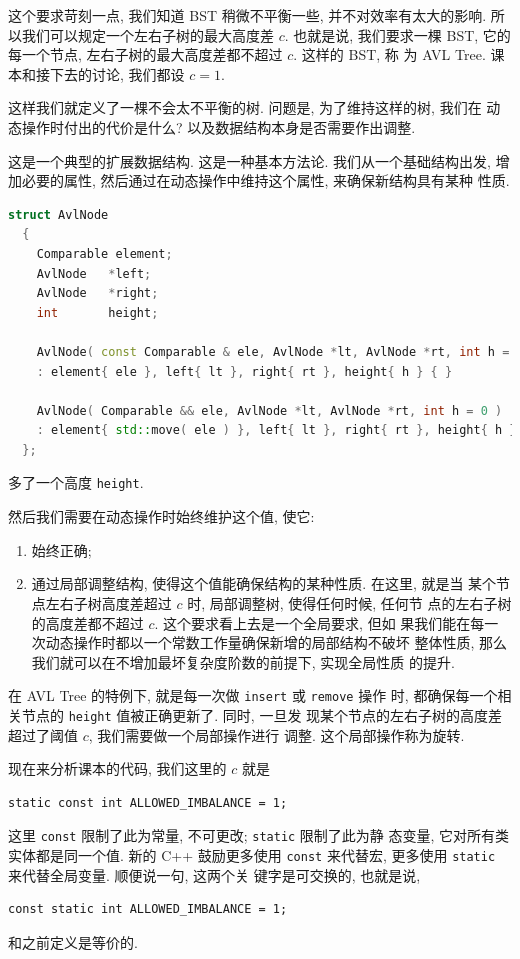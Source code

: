 \documentclass[a4paper]{ctexart}
\theoremstyle{definition}
\theoremstyle{definition}
\begin{document}
这个要求苛刻一点, 我们知道 BST 稍微不平衡一些, 并不对效率有太大的影响.
所以我们可以规定一个左右子树的最大高度差 $c$. 也就是说, 我们要求一棵
BST, 它的每一个节点, 左右子树的最大高度差都不超过 $c$. 这样的 BST, 称
为 AVL Tree. 课本和接下去的讨论, 我们都设 $c = 1$.

这样我们就定义了一棵不会太不平衡的树. 问题是, 为了维持这样的树, 我们在
动态操作时付出的代价是什么? 以及数据结构本身是否需要作出调整.

这是一个典型的扩展数据结构. 这是一种基本方法论. 我们从一个基础结构出发,
增加必要的属性, 然后通过在动态操作中维持这个属性, 来确保新结构具有某种
性质.

\begin{lstlisting}[language=C++]
  struct AvlNode
  {
    Comparable element;
    AvlNode   *left;
    AvlNode   *right;
    int       height;

    AvlNode( const Comparable & ele, AvlNode *lt, AvlNode *rt, int h = 0 )
    : element{ ele }, left{ lt }, right{ rt }, height{ h } { }
    
    AvlNode( Comparable && ele, AvlNode *lt, AvlNode *rt, int h = 0 )
    : element{ std::move( ele ) }, left{ lt }, right{ rt }, height{ h } { }
  };
\end{lstlisting}

多了一个高度 \verb|height|. 

然后我们需要在动态操作时始终维护这个值, 使它:
\begin{enumerate}
\item 始终正确;
\item 通过局部调整结构, 使得这个值能确保结构的某种性质. 在这里, 就是当
  某个节点左右子树高度差超过 $c$ 时, 局部调整树, 使得任何时候, 任何节
  点的左右子树的高度差都不超过 $c$. 这个要求看上去是一个全局要求, 但如
  果我们能在每一次动态操作时都以一个常数工作量确保新增的局部结构不破坏
  整体性质, 那么我们就可以在不增加最坏复杂度阶数的前提下, 实现全局性质
  的提升. 
\end{enumerate}

在 AVL Tree 的特例下, 就是每一次做 \verb|insert| 或 \verb|remove| 操作
时, 都确保每一个相关节点的 \verb|height| 值被正确更新了. 同时, 一旦发
现某个节点的左右子树的高度差超过了阈值 $c$, 我们需要做一个局部操作进行
调整. 这个局部操作称为旋转.

现在来分析课本的代码, 我们这里的 $c$ 就是
\begin{verbatim}
static const int ALLOWED_IMBALANCE = 1;
\end{verbatim}
这里 \verb|const| 限制了此为常量, 不可更改; \verb|static| 限制了此为静
态变量, 它对所有类实体都是同一个值. 新的 C++ 鼓励更多使用 \verb|const|
来代替宏, 更多使用 \verb|static| 来代替全局变量. 顺便说一句, 这两个关
键字是可交换的, 也就是说,
\begin{verbatim}
const static int ALLOWED_IMBALANCE = 1;
\end{verbatim}
和之前定义是等价的.
\end{document}
